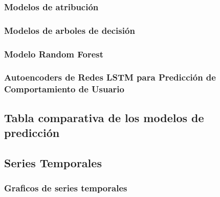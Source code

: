 \documentclass[letterpaper, 12pt]{report}
\begin{document}
\subsubsection{Modelos de atribución}


\subsubsection{Modelos de arboles de decisión}


\subsubsection{Modelo Random Forest}


\subsubsection{Autoencoders de Redes LSTM para Predicción de Comportamiento de Usuario}


\subsection{Tabla comparativa de los modelos de predicción}


\subsection{Series Temporales}

\subsubsection{Graficos de series temporales}

\end{document}
